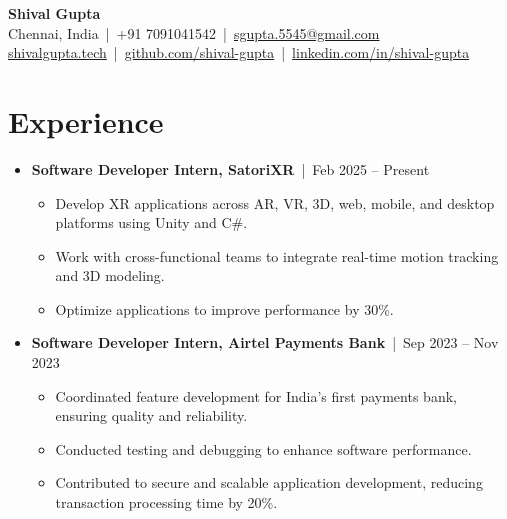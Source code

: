 \documentclass[a4paper,10pt]{article}
\newcommand{\subsectionbreak}{\vspace{0em}}
\begin{document}
\begin{center}
    {\fontsize{24pt}{28pt}\selectfont \textbf{Shival Gupta}} \\
    \vspace{0.2cm}
    \small Chennai, India \,|\, +91 7091041542 \,|\, \href{mailto:sgupta.5545@gmail.com}{\textcolor{accentcolor}{sgupta.5545@gmail.com}} \\
    \href{https://shivalgupta.tech/}{\textcolor{accentcolor}{shivalgupta.tech}} \,|\, \href{https://github.com/shival-gupta/}{\textcolor{accentcolor}{github.com/shival-gupta}} \,|\, \href{https://linkedin.com/in/shival-gupta/}{\textcolor{accentcolor}{linkedin.com/in/shival-gupta}}
\end{center}

\vspace{-0.3cm}

\section{Experience}
\begin{itemize}[noitemsep, topsep=0pt]
    \item \textbf{Software Developer Intern, SatoriXR} \,|\, Feb 2025 – Present
        \subsectionbreak
        \begin{itemize}
            \item Develop XR applications across AR, VR, 3D, web, mobile, and desktop platforms using Unity and C\#.
            \item Work with cross-functional teams to integrate real-time motion tracking and 3D modeling.
            \item Optimize applications to improve performance by 30\%.
        \end{itemize}
        \subsectionbreak
    \item \textbf{Software Developer Intern, Airtel Payments Bank} \,|\, Sep 2023 – Nov 2023
        \subsectionbreak
        \begin{itemize}
            \item Coordinated feature development for India's first payments bank, ensuring quality and reliability.
            \item Conducted testing and debugging to enhance software performance.
            \item Contributed to secure and scalable application development, reducing transaction processing time by 20\%.
        \end{itemize}
\end{itemize}
\end{document}
